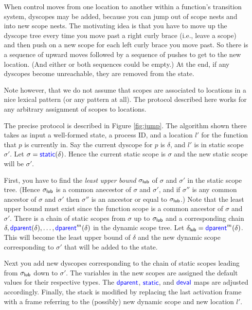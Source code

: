 When control moves from one location to another within a function's
transition system, dyscopes may be added, because you can jump out of
scope nests and into new scope nests. The motivating idea is that you
have to move up the dyscope tree every time you move past a right
curly brace (i.e., leave a scope) and then push on a new scope for
each left curly brace you move past. So there is a sequence of upward
moves followed by a sequence of pushes to get to the new
location. (And either or both sequences could be empty.)  At the end,
if any dyscopes become unreachable, they are removed from the state.

Note however, that we do not assume that scopes are associated to
locations in a nice lexical pattern (or any pattern at all). The
protocol described here works for any arbitrary assignment of scopes
to locations.

The precise protocol is described in Figure \ref{fig:jump}.  The
algorithm shown there takes as input a well-formed state, a process
ID, and a location $l'$ for the function that $p$ is currently in.
Say the current dyscope for $p$ is $\delta$, and $l'$ is in
static scope $\sigma'$. Let $\sigma=\textup{\textsf{\textcolor{blue}{static}}}(\delta)$.  Hence the
current static scope is $\sigma$ and the new static scope will be $\sigma'$.

First, you have to find the \emph{least upper bound} $\sigma_{\textup{\textsf{lub}}}$ of
$\sigma$ and $\sigma'$ in the static scope tree. (Hence $\sigma_{\textup{\textsf{lub}}}$ is a
common anecestor of $\sigma$ and $\sigma'$, and if $\sigma''$ is any
common ancestor of $\sigma$ and $\sigma'$ then $\sigma''$ is an
ancestor or equal to $\sigma_{\textup{\textsf{lub}}}$.)  Note that the least upper bound must
exist since the function scope is a common ancestor of $\sigma$ and
$\sigma'$.  There is a chain of static scopes from $\sigma$ up to
$\sigma_{\textup{\textsf{lub}}}$ and a corresponding chain
$\delta,\textup{\textsf{\textcolor{blue}{dparent}}}(\delta),\ldots,\textup{\textsf{\textcolor{blue}{dparent}}}^m(\delta)$ in the dynamic
scope tree.  Let $\delta_{\textup{\textsf{lub}}}=\textup{\textsf{\textcolor{blue}{dparent}}}^m(\delta)$.  This
will become the least upper bound of $\delta$ and the new dynamic
scope corresponding to $\sigma'$ that will be added to the state.

Next you add new dyscopes corresponding to the chain of static
scopes leading from $\sigma_{\textup{\textsf{lub}}}$ down to $\sigma'$.  The variables in the
new scopes are assigned the default values for their respective types.
The $\textup{\textsf{\textcolor{blue}{dparent}}}$, $\textup{\textsf{\textcolor{blue}{static}}}$, and $\textup{\textsf{\textcolor{blue}{deval}}}$ maps are adjusted
accordingly.  Finally, the stack is modified by replacing the last
activation frame with a frame referring to the (possibly) new dynamic
scope and new location $l'$.

